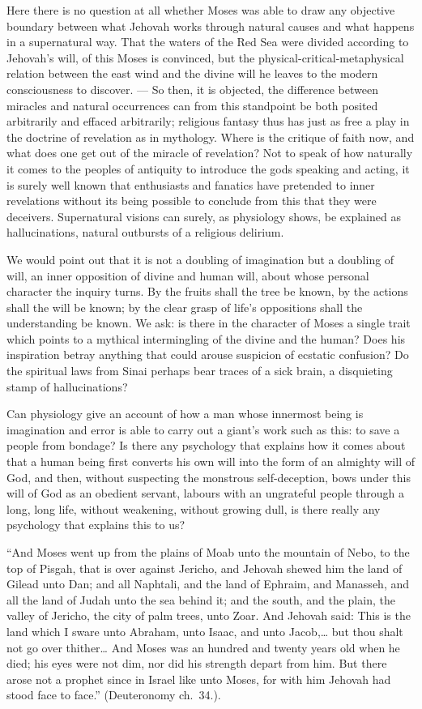 \documentclass[12pt,a4paper,openany]{book}
\newcommand{\opage}[1]{\marginnote{\footnotesize\textit{[#1]}}}
\begin{document}
Here there is no question at all whether Moses
was able to draw any objective boundary between
what Jehovah works through natural causes and what
happens in a supernatural way. That the waters of the
Red Sea were divided according to Jehovah's will, of this Moses
is convinced, but the physical-critical-metaphysical relation
between the east wind and the divine will
he leaves to the modern consciousness to discover. --- So
then, it is objected, the difference between miracles
and natural occurrences can from this standpoint be both
posited arbitrarily and effaced arbitrarily; religious
fantasy thus has just as free a play in the doctrine of revelation
as in mythology. Where is the critique of faith now,
and what does one get out of the miracle of revelation?
Not to speak of how naturally it comes to the peoples
of antiquity to introduce the gods speaking and acting,
it is surely well known that enthusiasts and fanatics have
pretended to inner revelations without its being possible to
conclude from this that they were deceivers. Supernatural visions can
surely, as physiology shows, be explained as hallucinations,
natural outbursts of a religious delirium.

We would point out that it is not a doubling of imagination but
a doubling of will, an inner opposition of divine
and human will, about whose personal
character the inquiry turns. By the fruits
shall the tree be known, by the actions shall the will be known;
\setcounter{footnote}{0}%
\opage{30}by the clear grasp of life's oppositions shall
the understanding be known. We ask: is there in the character
of Moses a single trait which points to a mythical intermingling
of the divine and the human? Does
his inspiration betray anything that could arouse suspicion of
ecstatic confusion? Do the spiritual laws from Sinai perhaps bear
traces of a sick brain, a disquieting stamp of
hallucinations?

Can physiology give an account of how a
man whose innermost being is imagination and error
is able to carry out a giant's work such as this: to save
a people from bondage? Is there any psychology that
explains how it comes about that a human being first
converts his own will into the form of an almighty will of God,
and then, without suspecting the monstrous self-deception,
bows under this will of God as an obedient servant,
labours with an ungrateful people through a long, long life,
without weakening, without growing dull, is there
really any psychology that explains this to us?

``And Moses went up from the plains of Moab unto the mountain
of Nebo, to the top of Pisgah, that is over against Jericho,
and Jehovah shewed him the land of Gilead unto Dan; and
all Naphtali, and the land of Ephraim, and Manasseh, and all
the land of Judah unto the sea behind it; and the south, and
the plain, the valley of Jericho, the city of palm trees, unto Zoar. And
Jehovah said: This is the land which I sware unto
Abraham, unto Isaac, and unto Jacob,\dots{} but thou shalt not go
over thither\dots{} And Moses was an hundred and twenty years old
when he died; his eyes were not dim, nor did
his strength depart from him. But there arose not a prophet
since in Israel like unto Moses, for with him Jehovah had
stood face to face.'' (Deuteronomy ch.\ 34.).
\end{document}
